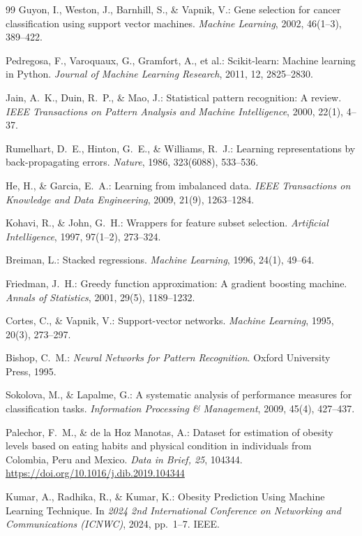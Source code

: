 \documentclass[12pt, a4paper]{article}
\begin{document}
\begin{thebibliography}{99}
Guyon, I., Weston, J., Barnhill, S., \& Vapnik, V.: Gene selection for cancer
classification using support vector machines. \textit{Machine Learning}, 2002,
46(1--3), 389--422.

Pedregosa, F., Varoquaux, G., Gramfort, A., et al.: Scikit-learn: Machine learning in
Python. \textit{Journal of Machine Learning Research}, 2011, 12, 2825--2830.

Jain, A.~K., Duin, R.~P., \& Mao, J.: Statistical pattern recognition: A review.
\textit{IEEE Transactions on Pattern Analysis and Machine Intelligence}, 2000, 22(1),
4--37.

Rumelhart, D.~E., Hinton, G.~E., \& Williams, R.~J.: Learning representations by
back-propagating errors. \textit{Nature}, 1986, 323(6088), 533--536.

He, H., \& Garcia, E.~A.: Learning from imbalanced data. \textit{IEEE Transactions on
Knowledge and Data Engineering}, 2009, 21(9), 1263--1284.

Kohavi, R., \& John, G.~H.: Wrappers for feature subset selection.
\textit{Artificial Intelligence}, 1997, 97(1--2), 273--324.

Breiman, L.: Stacked regressions. \textit{Machine Learning}, 1996, 24(1), 49--64.

Friedman, J.~H.: Greedy function approximation: A gradient boosting machine.
\textit{Annals of Statistics}, 2001, 29(5), 1189--1232.

Cortes, C., \& Vapnik, V.: Support-vector networks. \textit{Machine Learning}, 1995,
20(3), 273--297.

Bishop, C.~M.: \textit{Neural Networks for Pattern Recognition}. Oxford University
Press, 1995.

Sokolova, M., \& Lapalme, G.: A systematic analysis of performance measures for
classification tasks. \textit{Information Processing \& Management}, 2009, 45(4),
427--437.

Palechor, F.~M., \& de la Hoz Manotas, A.: Dataset for estimation of obesity levels
based on eating habits and physical condition in individuals from Colombia, Peru and
Mexico. \textit{Data in Brief, 25}, 104344.
\url{https://doi.org/10.1016/j.dib.2019.104344}

Kumar, A., Radhika, R., \& Kumar, K.: Obesity Prediction Using Machine Learning
Technique. In \textit{2024 2nd International Conference on Networking and
Communications (ICNWC)}, 2024, pp.\ 1--7. IEEE.


\end{thebibliography}
\end{document}

